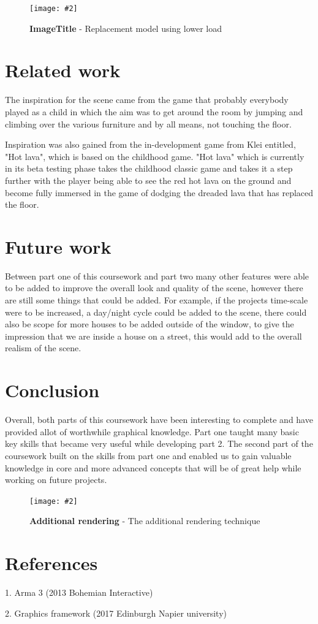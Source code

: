 \documentclass[10pt, a4paper]{article}
\newcommand{\figuremacro}[5]{
    \begin{figure}[#1]
        \centering
        \texttt{[image: \#2]}
        \caption[#3]{\textbf{#3}#4}
        \label{fig:#2}
    \end{figure}
}
\begin{document}
\figuremacro{h}{replacementloadcontent.png}{ImageTitle}{ - Replacement model using lower load}{0.8}


\section{Related work}

The inspiration for the scene came from the game that
probably everybody played as a child in which the aim
was to get around the room by jumping and climbing over
the various furniture and by all means, not touching the
floor.

Inspiration was also gained from the in-development
game from Klei entitled, "Hot lava", which is based on
the childhood game. "Hot lava" which is currently in its
beta testing phase takes the childhood classic game and
takes it a step further with the player being able to see the
red hot lava on the ground and become fully immersed in
the game of dodging the dreaded lava that has replaced
the floor.

\section{Future work}
Between part one of this coursework and part two many other features were able to be added to improve the overall look and quality of the scene, however there are still some things that could be added. For example, if the projects time-scale were to be increased, a day/night cycle could be added to the scene, there could also be scope for more houses to be added outside of the window, to give the impression that we are inside a house on a street, this would add to the overall realism of the scene.
\section{Conclusion}

Overall, both parts of this coursework have been interesting to complete and have provided allot of worthwhile graphical knowledge. Part one taught many basic key skills that became very useful while developing part 2. The second part of the coursework built on the skills from part one and enabled us to gain valuable knowledge in core and more advanced concepts that will be of great help while working on future projects. 
\figuremacro{h}{additional.png}{Additional rendering}{ - The additional rendering technique}{1.0} 	


\section{References}
1. Arma 3 (2013 Bohemian Interactive)

2. Graphics framework (2017 Edinburgh Napier university)
\end{document}
